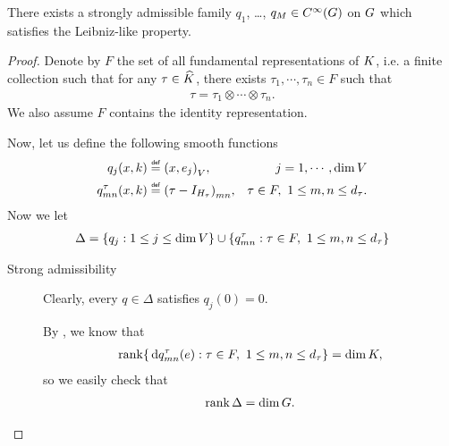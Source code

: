 \begin{lemma}
    There exists a strongly admissible family $q_1$, \dots, $q_M \in {C^\infty(G)}$ on $G$ which satisfies the Leibniz-like property.
\end{lemma}
\begin{proof}
    Denote by $F$ the set of all fundamental representations of $K$,
    i.e. a finite collection such that for any $\tau \in {\widehat{K}}$,
    there exists $\tau_1, \cdots, \tau_n \in F$ such that
    \begin{align*}
        \tau = \tau_1 \otimes \cdots \otimes \tau_n.
    \end{align*}
    We also assume $F$ contains the identity representation.

    Now,
    let us define the following smooth functions
    \begin{align*}
        q_j(x, k) &\defeq \ip {x} {e_j}, &j = 1, \cdots, \dim \VectorSpace\\
        q^\tau_{m n}(x, k) &\defeq {\left(\tau - \Id {H_\tau}\right)}_{m n},
        &\tau \in F, \ 1 \leq m, n \leq \dimRep \tau.
    \end{align*}
    Now we let
    \begin{align*}
        \Delta = \{q_j : 1 \leq j \leq \dim V\}
        \cup \{q^\tau_{m n} : \tau \in F, \ 1 \leq m, n \leq {d_{\tau}}\}
    \end{align*}

    \begin{description}
        \item [Strong admissibility]
            Clearly, every $q \in \Delta$ satisfies $q_j(0) = 0$.

            By \cite[Lemma 5.11]{Fischer2015},
            we know that
            \begin{align*}
                \operatorname{rank} \{\,\mathrm{d} q^\tau_{m n}(e) : \tau \in F, \ 1 \leq m, n \leq {d_{\tau}}\} = \dim K,
            \end{align*}
            so we easily check that
            \begin{align*}
                \operatorname{rank} \Delta = \dim G.
            \end{align*}


\end{description}
\end{proof}
